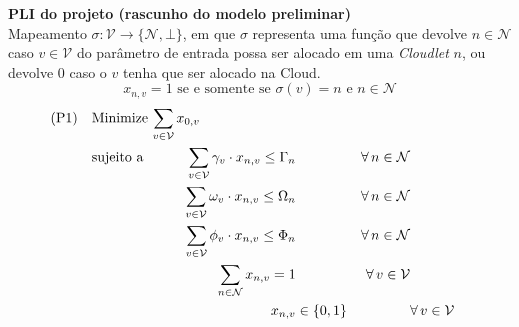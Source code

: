 \documentclass[12pt, a4paper]{article}
\theoremstyle{definition}
\newcommand\CPU{\Omega}
\newcommand\MEMORY{\Phi}
\newcommand\STORAGE{\Gamma}
\newcommand\cpu{\omega}
\newcommand\memory{\phi}
\newcommand\storage{\gamma}
\newcommand\threshold{\tau}
\newcommand\position{c_{t}}
\begin{document}
\textbf{PLI do projeto (rascunho do modelo preliminar)}
\\

Mapeamento $\sigma: \mathcal{V} \rightarrow \{\mathcal{N},\bot\}$, em que $\sigma$ representa uma função que devolve $n \in \mathcal{N}$ caso $v \in \mathcal{V}$ do parâmetro de entrada possa ser alocado em uma \emph{Cloudlet} $n$, ou devolve $0$ caso o $v$ tenha que ser alocado na Cloud.
\begin{equation}\label{def:sigma_x_1}
    x_{n, v} = 1 \text{ se e somente se } \sigma(v) = n \text{ e } n \in \mathcal{N}
\end{equation}
\begin{alignat}{4}
\mathrm{(P1)} \quad & \omit\rlap{Minimize $\displaystyle \sum_{v \in \mathcal{V}} x_{0,v}$}\nonumber\\
                   & \mbox{sujeito a} && \quad & \sum_{v \in \mathcal{V}} \storage_v \cdot x_{n, v} \leq \STORAGE_{n}      &\qquad & \forall\, n \in \mathcal{N} \label{pl:C11}\\
                   &                  && \quad & \sum_{v \in \mathcal{V}} \cpu_v \cdot x_{n, v} \leq \CPU_{n}      &\qquad & \forall\, n \in \mathcal{N} \label{pl:C12}\\
                   &                  && \quad & \sum_{v \in \mathcal{V}} \memory_v \cdot x_{n, v} \leq \MEMORY_{n}      &\qquad & \forall\, n \in \mathcal{N} \label{pl:C13}\\
                   &                  && \quad & \sum_{n \in \mathcal{N}} x_{n, v} = 1    &\qquad & \forall\, v \in \mathcal{V} \label{pl:C13}\\
                   &                  &&       &  x_{n,v}                           & \in \{0,1\} &       & \forall\, v \in \mathcal{V}\nonumber
\end{alignat}
\end{document}
